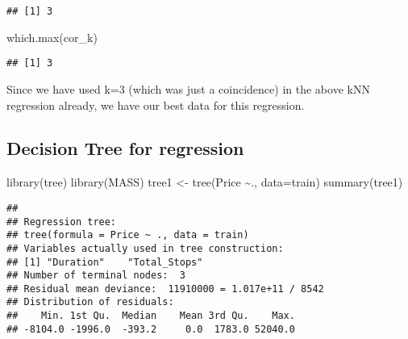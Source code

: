 \documentclass[
]{article}
\newenvironment{Shaded}{\begin{snugshade}}{\end{snugshade}}
\newcommand{\AttributeTok}[1]{\textcolor[rgb]{0.77,0.63,0.00}{#1}}
\newcommand{\FunctionTok}[1]{\textcolor[rgb]{0.00,0.00,0.00}{#1}}
\newcommand{\NormalTok}[1]{#1}
\newcommand{\OtherTok}[1]{\textcolor[rgb]{0.56,0.35,0.01}{#1}}
\newcommand{\SpecialCharTok}[1]{\textcolor[rgb]{0.00,0.00,0.00}{#1}}
\newcommand{\StringTok}[1]{\textcolor[rgb]{0.31,0.60,0.02}{#1}}
\begin{document}
\begin{verbatim}
## [1] 3
\end{verbatim}

\begin{Shaded}
\begin{Highlighting}[]
\FunctionTok{which.max}\NormalTok{(cor\_k)}
\end{Highlighting}
\end{Shaded}

\begin{verbatim}
## [1] 3
\end{verbatim}

Since we have used k=3 (which was just a coincidence) in the above kNN
regression already, we have our best data for this regression.

\hypertarget{decision-tree-for-regression}{%
\subsection{Decision Tree for
regression}\label{decision-tree-for-regression}}

\begin{Shaded}
\begin{Highlighting}[]
\FunctionTok{library}\NormalTok{(tree)}
\FunctionTok{library}\NormalTok{(MASS)}
\NormalTok{tree1 }\OtherTok{\textless{}{-}} \FunctionTok{tree}\NormalTok{(Price }\SpecialCharTok{\textasciitilde{}}\NormalTok{., }\AttributeTok{data=}\NormalTok{train)}
\FunctionTok{summary}\NormalTok{(tree1)}
\end{Highlighting}
\end{Shaded}

\begin{verbatim}
## 
## Regression tree:
## tree(formula = Price ~ ., data = train)
## Variables actually used in tree construction:
## [1] "Duration"    "Total_Stops"
## Number of terminal nodes:  3 
## Residual mean deviance:  11910000 = 1.017e+11 / 8542 
## Distribution of residuals:
##    Min. 1st Qu.  Median    Mean 3rd Qu.    Max. 
## -8104.0 -1996.0  -393.2     0.0  1783.0 52040.0
\end{verbatim}

\begin{Shaded}
\end{Shaded}
\end{document}
